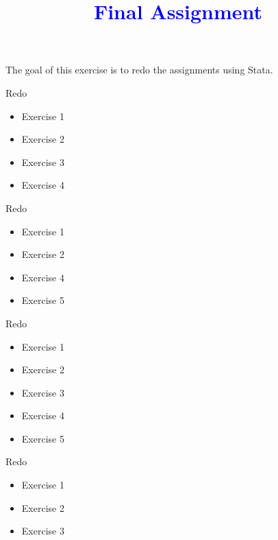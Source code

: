 \documentclass[10pt,a4paper]{article}
\newcommand{\1}{\mathds{1}}
\begin{document}
\doublespacing

\title{\textcolor{blue}{Final Assignment}}
\maketitle

The goal of this exercise is to redo the assignments using Stata. 


\begin{Exercise}[title=Assignment 1]
Redo
\begin{itemize}
\item Exercise 1
\item Exercise 2
\item Exercise 3
\item Exercise 4
\end{itemize}
\end{Exercise}


\begin{Exercise}[title=Assignment 2]
Redo
\begin{itemize}
\item Exercise 1
\item Exercise 2
\item Exercise 4
\item Exercise 5
\end{itemize}
\end{Exercise}


\begin{Exercise}[title=Assignment 3]
Redo
\begin{itemize}
\item Exercise 1
\item Exercise 2
\item Exercise 3
\item Exercise 4
\item Exercise 5
\end{itemize}
\end{Exercise}

\begin{Exercise}[title=Assignment 4]
Redo
\begin{itemize}
\item Exercise 1
\item Exercise 2
\item Exercise 3
\end{itemize}
\end{Exercise}
\end{document}
